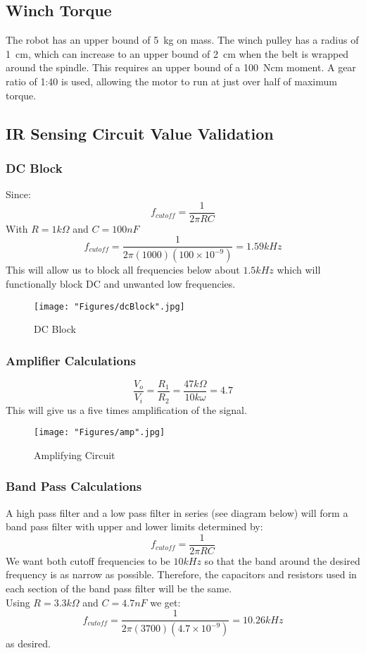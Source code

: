 	\subsection{Winch Torque}
	The robot has an upper bound of 5~kg on mass. The winch pulley has a radius of 1~cm, which can increase to an upper bound of 2~cm when the belt is wrapped around the spindle. This requires an upper bound of a 100~Ncm moment. A gear ratio of 1:40 is used, allowing the motor to run at just over half of maximum torque.
	
	\subsection{IR Sensing Circuit Value Validation}
		\subsubsection{DC Block}
		Since:
		$$f_{cutoff} = \frac{1}{2\pi RC}$$
		With $R=1k\Omega$ and $C=100nF$
		$$f_{cutoff} = \frac{1}{2\pi(1000)(100\times10^{-9})} = 1.59kHz$$
		This will allow us to block all frequencies below about $1.5kHz$ which will functionally block DC and unwanted low frequencies.
		\begin{figure}[h]
			\centering
			\texttt{[image: "Figures/dcBlock".jpg]}
			\caption*{DC Block}
		\end{figure}
		
		\subsubsection{Amplifier Calculations}
		$$\frac{V_o}{V_i} =\frac{R_1}{R_2} = \frac{47k\Omega}{10k\omega} = 4.7$$
		This will give us a five times amplification of the signal.
	
		\begin{figure}[h]
			\centering
			\texttt{[image: "Figures/amp".jpg]}
			\caption*{Amplifying Circuit}
		\end{figure}
		
		\newpage
		\subsubsection{Band Pass Calculations}
		A high pass filter and a low pass filter in series (see diagram below) will form a band pass filter with upper and lower limits determined by:
		$$f_{cutoff} = \frac{1}{2\pi RC}$$
		We want both cutoff frequencies to be $10kHz$ so that the band around the desired frequency is as narrow as possible. Therefore, the capacitors and resistors used in each section of the band pass filter will be the same. \newline \\
		Using $R = 3.3k\Omega$ and $C = 4.7nF$ we get:
		$$f_{cutoff} = \frac{1}{2\pi(3700)(4.7\times10^{-9})} = 10.26kHz$$
		as desired.
		
